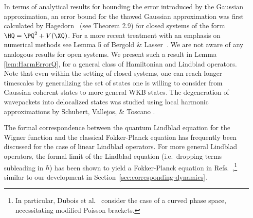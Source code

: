 \documentclass{article}
\numberwithin{equation}{section}
\begin{document}
In terms of analytical results for bounding the error introduced by the Gaussian approximation, an error bound for the thawed Gaussian approximation was first calculated by Hagedorn~\cite{hagedorn1998raising} (see Theorem 2.9) for closed systems of the form $\HQ = \PQ^2 + V(\XQ)$.
For a more recent treatment with an emphasis on numerical methods see Lemma 5 of Bergold \& Lasser~\cite{bergold2022error}.
We are not aware of any analogous results for open systems. We present such a result in Lemma \ref{lem:HarmErrorQ}, for a general class of Hamiltonian and Lindblad operators.  
Note that even within the setting of closed systems, one can reach longer timescales by generalizing the set of states one is willing to consider from Gaussian coherent states to more general WKB states.  The degeneration of wavepackets into delocalized states was studied using local harmonic approximations by Schubert, Vallejos, \& Toscano \cite{schubert2012wave}.


The formal correspondence between the quantum Lindblad equation for the Wigner function and the classical Fokker-Planck equation has frequently been discussed for the case of linear Lindblad operators. For more general Lindblad operators, the formal limit of the Lindblad equation (i.e.\ dropping terms subleading in $\hbar$) has been shown to yield a Fokker-Planck equation in Refs.~\cite{frigerio1984diffusion,tzanakis1998generalized,strunz1998classical,dubois2021semiclassical},\footnote{In particular, Dubois et al.~\cite{dubois2021semiclassical} consider the case of a curved phase space, necessitating modified Poisson brackets.} 
similar to our development in Section~\ref{sec:corresponding-dynamics}.
\end{document}
